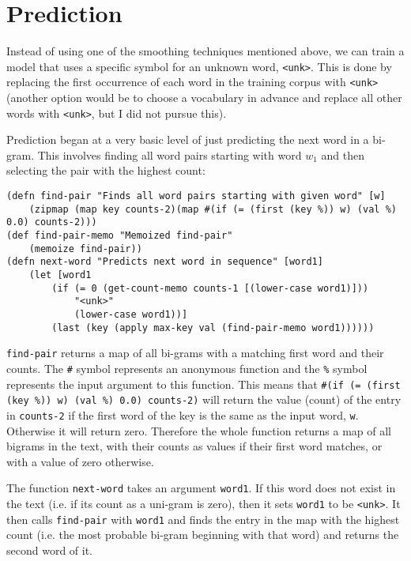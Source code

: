 \section{Prediction}

Instead of using one of the smoothing techniques mentioned above, we can train a model that uses a specific symbol for an unknown word, \lstinline!<unk>!. This is done by replacing the first occurrence of each word in the training corpus with \lstinline!<unk>! (another option would be to choose a vocabulary in advance and replace all other words with \lstinline!<unk>!, but I did not pursue this).

Prediction began at a very basic level of just predicting the next word in a bi-gram. This involves finding all word pairs starting with word $w_{1}$ and then selecting the pair with the highest count:

\begin{lstlisting}
(defn find-pair "Finds all word pairs starting with given word" [w] 
	(zipmap (map key counts-2)(map #(if (= (first (key %)) w) (val %) 0.0) counts-2)))
(def find-pair-memo "Memoized find-pair" 
	(memoize find-pair))
(defn next-word "Predicts next word in sequence" [word1] 
	(let [word1 
		(if (= 0 (get-count-memo counts-1 [(lower-case word1)]))
			"<unk>" 
			(lower-case word1))] 
		(last (key (apply max-key val (find-pair-memo word1))))))
\end{lstlisting}

\lstinline!find-pair! returns a map of all bi-grams with a matching first word and their counts. The \lstinline!#! symbol represents an anonymous function and the \lstinline!%! symbol represents the input argument to this function. This means that \lstinline!#(if (= (first (key %)) w) (val %) 0.0) counts-2)! will return the value (count) of the entry in \lstinline!counts-2! if the first word of the key is the same as the input word, \lstinline!w!. Otherwise it will return zero. Therefore the whole function returns a map of all bigrams in the text, with their counts as values if their first word matches, or with a value of zero otherwise.

The function \lstinline!next-word! takes an argument \lstinline!word1!. If this word does not exist in the text (i.e. if its count as a uni-gram is zero), then it sets \lstinline!word1! to be \lstinline!<unk>!. It then calls \lstinline!find-pair! with \lstinline!word1! and finds the entry in the map with the highest count (i.e. the most probable bi-gram beginning with that word) and returns the second word of it.

